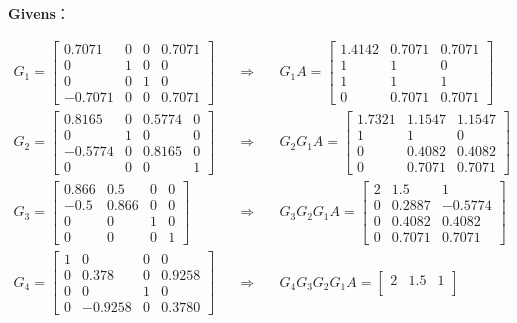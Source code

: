 \documentclass[12pt]{ctexart}
\begin{document}
	\textbf{Givens}：
	
	\begin{equation*}
	\begin{aligned}
	G_1=\begin{bmatrix}
	0.7071&0&0&0.7071 \\
	0&1&0&0 \\
	0&0&1&0 \\
	-0.7071&0&0&0.7071
	\end{bmatrix} &\quad\Rightarrow\quad
	&G_1A=\begin{bmatrix}
	1.4142&0.7071&0.7071 \\
	1&1&0 \\
	1&1&1 \\
	0&0.7071&0.7071
	\end{bmatrix} \\
	G_2=\begin{bmatrix}
	0.8165&0&0.5774&0 \\
	0&1&0&0 \\
	-0.5774&0&0.8165&0 \\
	0&0&0&1
	\end{bmatrix} &\quad\Rightarrow\quad
	&G_2G_1A=\begin{bmatrix}
	1.7321&1.1547&1.1547 \\
	1&1&0 \\
	0&0.4082&0.4082 \\
	0&0.7071&0.7071
	\end{bmatrix} \\
	G_3=\begin{bmatrix}
	0.866&0.5&0&0 \\
	-0.5&0.866&0&0 \\
	0&0&1&0 \\
	0&0&0&1
	\end{bmatrix} &\quad\Rightarrow\quad
	&G_3G_2G_1A=\begin{bmatrix}
	2&1.5&1 \\
	0&0.2887&-0.5774 \\
	0&0.4082&0.4082 \\
	0&0.7071&0.7071
	\end{bmatrix} \\
	G_4=\begin{bmatrix}
	1&0&0&0 \\
	0&0.378&0&0.9258 \\
	0&0&1&0 \\
	0&-0.9258&0&0.3780
	\end{bmatrix} &\quad\Rightarrow\quad
	&G_4G_3G_2G_1A=\begin{bmatrix}
	2&1.5&1 \\

\end{bmatrix}
\end{aligned}
\end{equation*}
\end{document}
